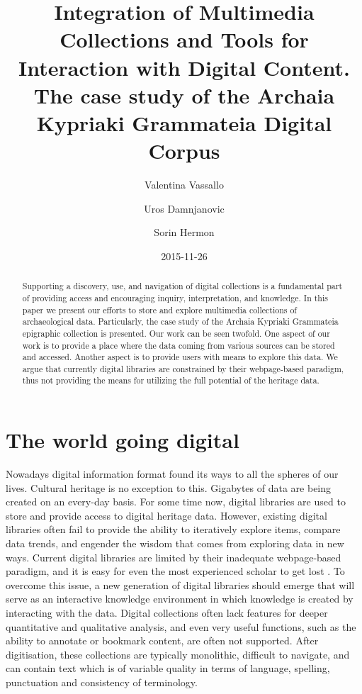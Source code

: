 \documentclass[amsthm,ebook]{saparticle}
\title{Integration of Multimedia Collections and Tools
for Interaction with Digital Content.
The case study of the Archaia Kypriaki Grammateia Digital Corpus}
\author[cyi]{Valentina Vassallo\corref{first}}
\author[cyi]{Uros Damnjanovic}
\author[cyi]{Sorin Hermon}
\date{2015-11-26}
\begin{document}
\maketitle
\begin{abstract}
Supporting a discovery, use, and navigation of digital collections is a fundamental part of providing access and
encouraging inquiry, interpretation, and knowledge. In this paper we present our efforts to store and explore
multimedia collections of archaeological data. Particularly, the case study of the Archaia Kypriaki Grammateia
epigraphic collection is presented. Our work can be seen twofold. One aspect of our work is to provide a place where
the data coming from various sources can be stored and accessed. Another aspect is to provide users with means to explore
this data. We argue that currently digital libraries are constrained by their webpage-based paradigm, thus not
providing the means for utilizing the full potential of the heritage data.
\end{abstract}

\section{The world going digital}


\noindent Nowadays digital information format found its ways to all the spheres of our lives. Cultural heritage is no exception to
this. Gigabytes of data are being created on an every-day basis. For some time now, digital libraries are used to store
and provide access to digital heritage data. However, existing digital libraries often fail to provide the ability to
iteratively explore items, compare data trends, and engender the wisdom that comes from exploring data in new ways.
Current digital libraries are limited by their inadequate webpage-based paradigm, and it is easy for even the most
experienced scholar to get lost \citep{augmenting_2009}.
To overcome this issue, a new generation of digital
libraries should emerge that will serve as an interactive knowledge environment in which knowledge is created by
interacting with the data. Digital collections often lack features for deeper quantitative and qualitative analysis,
and even very useful functions, such as the ability to annotate or bookmark content, are often not supported. After
digitisation, these collections are typically monolithic, difficult to navigate, and can contain text which is of
variable quality in terms of language, spelling, punctuation and consistency of terminology. 
\end{document}
